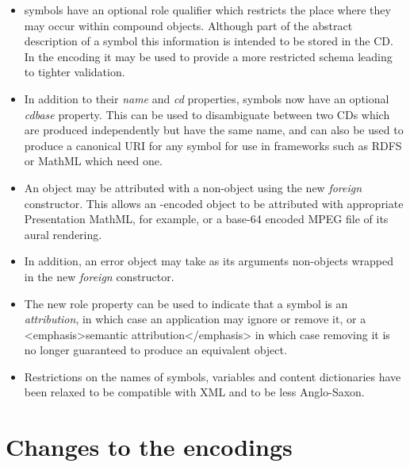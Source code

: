 \begin{appendix}
\begin{itemize}
\item \OM symbols have an optional role qualifier which restricts the place where they may
  occur within compound objects.  Although part of the abstract description of a symbol
  this information is intended to be stored in the CD.  In the \XML encoding it may be
  used to provide a more restricted schema leading to tighter validation.
\item In addition to their \emph{name} and \emph{cd} properties, symbols now have an
  optional \emph{cdbase} property.  This can be used to disambiguate between two CDs which
  are produced independently but have the same name, and can also be used to produce a
  canonical URI for any \OM symbol for use in frameworks such as RDFS or MathML which need
  one.
\item An \OM object may be attributed with a non-\OM object using the new \emph{foreign}
  constructor.  This allows an \XML-encoded \OM object to be attributed with appropriate
  Presentation MathML, for example, or a base-64 encoded MPEG file of its aural rendering.
\item In addition, an \OM error object may take as its arguments non-\OM objects wrapped
  in the new \emph{foreign} constructor.
\item The new role property can be used to indicate that a symbol is an
  \emph{attribution}, in which case an application may ignore or remove it, or a
  <emphasis>semantic attribution</emphasis> in which case removing it is no longer
  guaranteed to produce an equivalent object.
\item Restrictions on the names of symbols, variables and content dictionaries have been
  relaxed to be compatible with XML and to be less Anglo-Saxon.
\end{itemize}
  
\section{Changes to the encodings}\label{chgenc}
    

\end{appendix}
